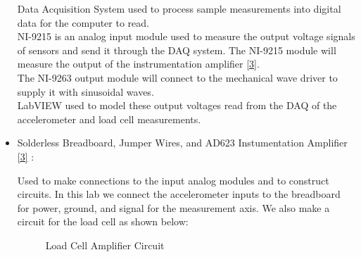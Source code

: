 \documentclass{article}
\begin{document}
\begin{itemize}
Data Acquisition System used to process sample measurements into digital data for the computer to read.\\[5pt]
NI-9215 is an analog input module used to measure the output voltage signals of sensors and send it through the DAQ system. The NI-9215 module will measure the output of the instrumentation amplifier \hyperlink{datasheets}{[3]}.\\[5pt]
The NI-9263 output module will connect to the mechanical wave driver to supply it with sinusoidal waves.\\[5pt]
LabVIEW used to model these output voltages read from the DAQ of the accelerometer and load cell measurements. 

\item Solderless Breadboard, Jumper Wires, and AD623 Instumentation Amplifier \hyperlink{datasheets}{[3]} : 
\vspace{1mm}

Used to make connections to the input analog modules and to construct circuits. In this lab we connect the accelerometer inputs to the breadboard for power, ground, and signal for the measurement axis. We also make a circuit for the load cell as shown below:

\begin{figure}[H]
    \centering
    \caption{Load Cell Amplifier Circuit}
    \label{fig:ampcircuit}
\end{figure}

\end{itemize}
\end{document}
